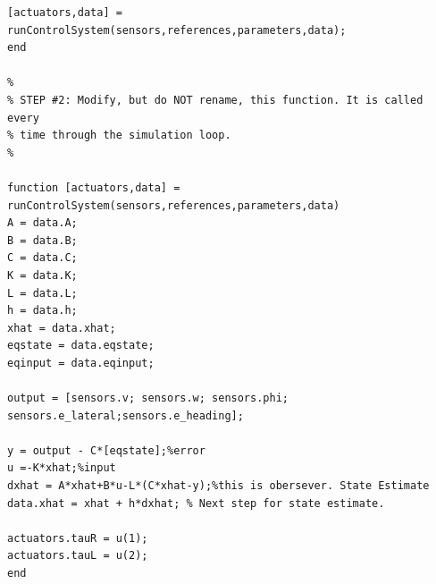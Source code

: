 \documentclass[12pt]{article}
\begin{document}
\begin{lstlisting}[label={closedCode},caption={Closed Loop Code}]
[actuators,data] = runControlSystem(sensors,references,parameters,data);
end

%
% STEP #2: Modify, but do NOT rename, this function. It is called every
% time through the simulation loop.
%

function [actuators,data] = runControlSystem(sensors,references,parameters,data)
A = data.A;
B = data.B;
C = data.C;
K = data.K;
L = data.L;
h = data.h;
xhat = data.xhat;
eqstate = data.eqstate;
eqinput = data.eqinput;

output = [sensors.v; sensors.w; sensors.phi; sensors.e_lateral;sensors.e_heading];

y = output - C*[eqstate];%error
u =-K*xhat;%input
dxhat = A*xhat+B*u-L*(C*xhat-y);%this is obersever. State Estimate
data.xhat = xhat + h*dxhat; % Next step for state estimate.

actuators.tauR = u(1);
actuators.tauL = u(2);
end
\end{lstlisting}
\clearpage
\end{document}
